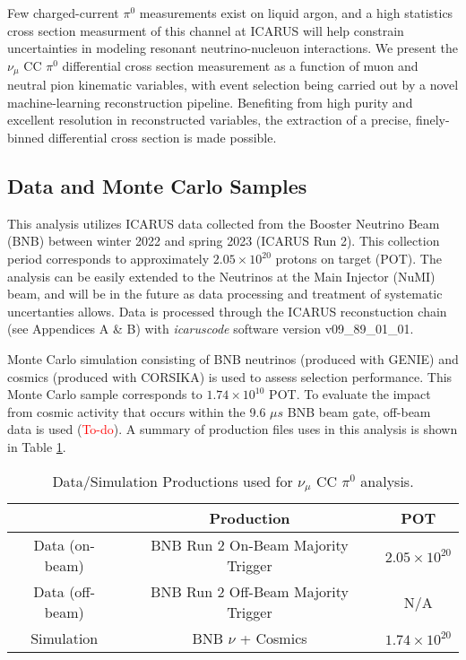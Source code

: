 \documentclass[../main.tex]{subfiles}
\begin{document}
Few charged-current $\pi^{0}$ measurements exist on liquid argon, and a high statistics cross section measurment of this channel at ICARUS will help constrain uncertainties in modeling resonant neutrino-nucleuon interactions.  We present the $\nu_{\mu}$ CC $\pi^{0}$ differential cross section measurement as a function of muon and neutral pion kinematic variables, with event selection being carried out by a novel machine-learning reconstruction pipeline.  Benefiting from high purity and excellent resolution in reconstructed variables, the extraction of a precise, finely-binned differential cross section is made possible.


\subsection{Data and Monte Carlo Samples}
This analysis utilizes ICARUS data collected from the Booster Neutrino Beam (BNB) between winter 2022 and spring 2023 (ICARUS Run 2).  This collection period corresponds to approximately $2.05 \times 10^{20}$ protons on target (POT).  The analysis can be easily extended to the Neutrinos at the Main Injector (NuMI) beam, and will be in the future as data processing and treatment of systematic uncertanties allows.  Data is processed through the ICARUS reconstuction chain (see Appendices A \& B) with \textit{icaruscode} software version v09\_89\_01\_01.

Monte Carlo simulation consisting of BNB neutrinos (produced with GENIE) and cosmics (produced with CORSIKA) is used to assess selection performance.  This Monte Carlo sample corresponds to $1.74 \times 10^{10}$ POT.  To evaluate the impact from cosmic activity that occurs within the 9.6 $\mu s$ BNB beam gate, off-beam data is used (\textcolor{red}{To-do}).  A summary of production files uses in this analysis is shown in Table \ref{Tab:prod}.

\begin{table}[ht]
    \caption{Data/Simulation Productions used for $\nu_{\mu}$ CC $\pi^{0}$ analysis.}
    \vspace{0.1cm}
    \centering
    \begin{tabular}{ c c c } 
    \hline
      &  Production & POT  \\
    \hline
    Data (on-beam) & BNB Run 2 On-Beam Majority Trigger & $2.05 \times 10^{20}$ \\ 
    Data (off-beam) & BNB Run 2 Off-Beam Majority Trigger & N/A \\
    Simulation & BNB $\nu$ + Cosmics & $1.74 \times 10^{20}$ \\ 
    \hline
    \end{tabular}
    \label{Tab:prod}
\end{table}
\end{document}
